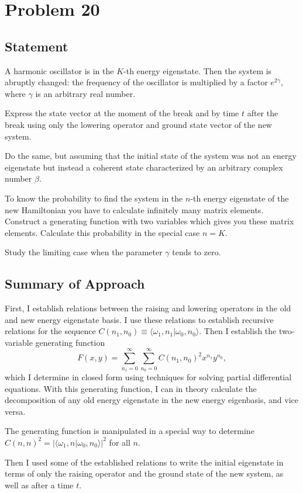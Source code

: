 \documentclass[12pt]{article}
\title{}
\date{}
\author{Jacob H. Nie}
\begin{document}
\section*{Problem 20}
\subsection*{Statement}
A harmonic oscillator is in the $K$-th energy eigenstate.  Then the system is abruptly changed: the frequency of the oscillator is multiplied by a factor $e^{2\gamma}$, where $\gamma$ is an arbitrary real number.  

Express the state vector at the moment of the break and by time $t$ after the break using only the lowering operator and ground state vector of the new system. 

Do the same, but assuming that the initial state of the system was not an energy eigenstate but instead a coherent state characterized by an arbitrary complex number $\beta$.

To know the probability to find the system in the $n$-th energy eigenstate of the new Hamiltonian you have to calculate infinitely many matrix elements.  Construct a generating function with two variables which gives you these matrix elements.  Calculate this probability in the special case $n = K.$ 

Study the limiting case when the parameter $\gamma$ tends to zero.

\subsection*{Summary of Approach}
	First, I establish relations between the raising and lowering operators in the old and new energy eigenstate basis.  I use these relations to establish recursive relations for the sequence $C(n_1,n_0)\equiv \langle \omega_1,n_1|\omega_0,n_0\rangle $.  Then I establish the two-variable generating function 
	\[
		F(x,y) = \sum_{n_1=0}^{\infty}\sum_{n_0=0}^{\infty} C(n_1,n_0)^2 x^{n_1}y^{n_0},
	\] 
which I determine in closed form using techniques for solving partial differential equations.  With this generating function, I can in theory calculate the decomposition of any old energy eigenstate in the new energy eigenbasis, and vice versa.  

The generating function is manipulated in a special way to determine $C(n,n)^2 = |\langle \omega_1,n|\omega_0,n_0\rangle|^2 $ for all $n.$

Then I used some of the established relations to write the initial eigenstate in terms of only the raising operator and the ground state of the new system, as well as after a time $t$.  
\end{document}
